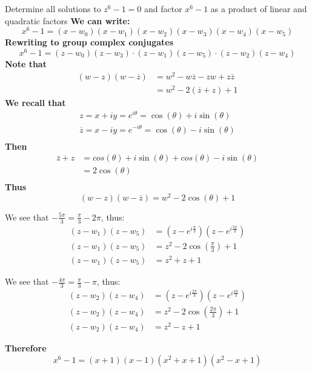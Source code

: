 \documentclass[a4paper, 8pt]{extarticle}
\begin{document}
\begin{examplebox}{Determine all solutions to $z^6 -1 = 0$ and factor $x^6-1$ as a product of linear and quadratic factors}{}
	\textbf{We can write:}
	$$x^6 -1 = (x - w_0)(x - w_1)(x - w_2)(x - w_3)(x - w_4)(x - w_5)$$
	\textbf{Rewriting to group complex conjugates}
	$$x^6 -1 = (z-w_0)(z-w_3) \cdot (z-w_1)(z-w_5) \cdot (z-w_2)(z-w_4)$$
	\textbf{Note that}
	\begin{align*}
		(w-z)(w-\overline{z}) & = w^2 - w\overline{z} - zw + z\overline{z} \\
		                      & = w^2 - 2(\overline{z} + z) + 1
	\end{align*}
	\textbf{We recall that}
	\begin{align*}
		z = x + iy = e^{i\theta} = \cos(\theta) + i\sin(\theta)             \\
		\overline{z} = x - iy = e^{-i\theta} = \cos(\theta) - i\sin(\theta) \\
	\end{align*}
	\textbf{Then}
	\begin{align*}
		\overline{z} + z & = cos(\theta) + i\sin(\theta) + cos(\theta) - i\sin(\theta) \\
		                 & = 2\cos(\theta)                                             \\
	\end{align*}
	\textbf{Thus}
	$$(w-z)(w-\overline{z})  = w^2 - 2\cos(\theta) + 1$$
	\begin{minipage}{0.49\textwidth}
		We see that $-\frac{5\pi}{3} = \frac{\pi}{3} - 2\pi$, thus:
		\begin{align*}
			(z-w_1)(z-w_5) & = (z - e^{i\frac{\pi}{3}})(z - e^{i\frac{5\pi}{3}}) \\
			(z-w_1)(z-w_5) & = z^2 - 2\cos\left(\frac{\pi}{3}\right) + 1         \\
			(z-w_1)(z-w_5) & = z^2 + z + 1
		\end{align*}
	\end{minipage}
	\begin{minipage}{0.5\textwidth}
		We see that $-\frac{4\pi}{3} = \frac{\pi}{3} - \pi$, thus:
		\begin{align*}
			(z-w_2)(z-w_4) & = (z - e^{i\frac{2\pi}{3}})(z - e^{i\frac{4\pi}{3}}) \\
			(z-w_2)(z-w_4) & = z^2 - 2\cos\left(\frac{2\pi}{3}\right) + 1         \\
			(z-w_2)(z-w_4) & = z^2 - z + 1
		\end{align*}
	\end{minipage}
	\textbf{Therefore}
	$$x^6 -1 = (x+1)(x-1)(x^2 + x + 1)(x^2 - x + 1)$$
\end{examplebox}
\end{document}
